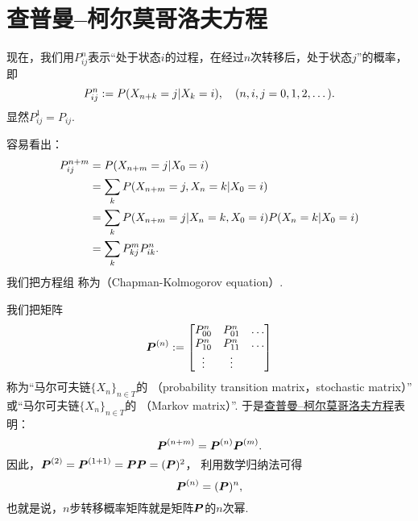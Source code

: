 \section{查普曼--柯尔莫哥洛夫方程}
现在，我们用\(P^n_{ij}\)表示“处于状态\(i\)的过程，在经过\(n\)次转移后，处于状态\(j\)”的概率，
即\begin{equation*}
	P^n_{ij}
	:=
	P(
		X_{n+k} = j
		\vert
		X_k = i
	),
	\quad(n,i,j=0,1,2,\dotsc).
\end{equation*}
显然\(P^1_{ij} = P_{ij}\).

容易看出：\begin{align}
	P^{n+m}_{ij}
	&= P(X_{n+m} = j \vert X_0 = i) \notag\\
	&= \sum_k P(X_{n+m} = j, X_n = k \vert X_0 = i) \notag\\
	&= \sum_k P(X_{n+m} = j \vert X_n = k, X_0 = i) P(X_n = k \vert X_0 = i) \notag\\
	&= \sum_k P^m_{kj} P^n_{ik}.
		\label{equation:马尔可夫链.CK方程}
\end{align}
我们把方程组 
称为（Chapman-Kolmogorov equation）.

我们把矩阵\begin{equation*}
	\boldsymbol{P}^{(n)}
	:= \begin{bmatrix}
		P^n_{00} & P^n_{01} & \dots \\
		P^n_{10} & P^n_{11} & \dots \\
		\vdots & \vdots & \\
	\end{bmatrix}
\end{equation*}
称为“马尔可夫链\(\{X_n\}_{n \in T}\)的 （probability transition matrix，stochastic matrix）”
或“马尔可夫链\(\{X_n\}_{n \in T}\)的 （Markov matrix）”.
于是\hyperref[equation:马尔可夫链.CK方程]{查普曼--柯尔莫哥洛夫方程}表明：\begin{equation}
	\boldsymbol{P}^{(n+m)}
	= \boldsymbol{P}^{(n)} \boldsymbol{P}^{(m)}.
\end{equation}
因此，\(
	\boldsymbol{P}^{(2)}
	= \boldsymbol{P}^{(1+1)}
	= \boldsymbol{P} \boldsymbol{P}
	= (\boldsymbol{P})^2
\)，
利用数学归纳法可得\begin{equation}
	\boldsymbol{P}^{(n)}
	= (\boldsymbol{P})^n,
\end{equation}
也就是说，\(n\)步转移概率矩阵就是矩阵\(\boldsymbol{P}\)的\(n\)次幂.
